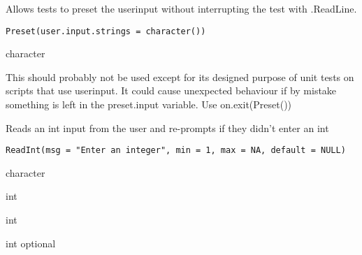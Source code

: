 \documentclass[a4paper]{book}
\begin{document}
%
\begin{Description}\relax
Allows tests to preset the userinput without interrupting the test with .ReadLine.
\end{Description}
%
\begin{Usage}
\begin{verbatim}
Preset(user.input.strings = character())
\end{verbatim}
\end{Usage}
%
\begin{Arguments}
\begin{ldescription}
\item[\code{user.input.strings}] character
\end{ldescription}
\end{Arguments}
%
\begin{Details}\relax
This should probably not be used except for its designed purpose of unit
tests on scripts that use userinput. It could cause unexpected behaviour if
by mistake something is left in the preset.input variable. Use on.exit(Preset())
\end{Details}
%
\begin{Description}\relax
Reads an int input from the user and re-prompts if they didn't enter an int
\end{Description}
%
\begin{Usage}
\begin{verbatim}
ReadInt(msg = "Enter an integer", min = 1, max = NA, default = NULL)
\end{verbatim}
\end{Usage}
%
\begin{Arguments}
\begin{ldescription}
\item[\code{msg}] character

\item[\code{min}] int

\item[\code{max}] int

\item[\code{default}] int optional
\end{ldescription}
\end{Arguments}
\printindex{}
\end{document}
